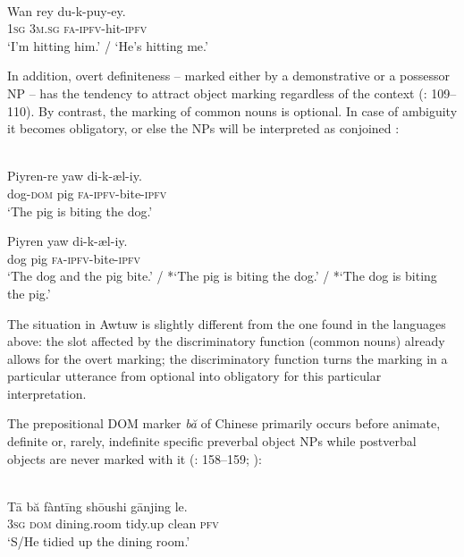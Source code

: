 \documentclass[output=paper]{langsci/langscibook}
\begin{document}
\ea\label{ex:serzant:18}
\\
\gll *Wan   rey   du-k-puy-ey.\\
     \textsc{1sg}   \textsc{3m.sg}  \textsc{fa-ipfv}{}-hit-\textsc{ipfv}\\
 ‘I’m hitting him.’ / ‘He’s hitting me.’
\z

In addition, overt definiteness – marked either by a demonstrative or a possessor NP – has the tendency to attract object marking regardless of the context (\citealt{Feldman1986}: 109\-–110). By contrast, the marking of common nouns is optional. In case of ambiguity it becomes obligatory, or else the NPs will be interpreted as conjoined \citep[110]{Feldman1986}:

\ea\label{ex:serzant:19}
\\
\ea
\gll Piyren-re  yaw  di-k-æl-iy.\\
     dog-\textsc{dom}  pig  \textsc{fa-ipfv}{}-bite-\textsc{ipfv}\\
\glt ‘The pig is biting the dog.’
\z

\ex
\gll Piyren  yaw  di-k-æl-iy.\\
     dog  pig  \textsc{fa-ipfv}{}-bite-\textsc{ipfv}\\
\glt ‘The dog and the pig bite.’ / *‘The pig is biting the dog.’ / *‘The dog is biting the pig.’
\z

The situation in Awtuw is slightly different from the one found in the languages above: the slot affected by the discriminatory function (common nouns) already allows for the overt marking; the discriminatory function turns the marking in a particular utterance from optional into obligatory for this particular interpretation.

The prepositional DOM marker \textit{bă} of Chinese primarily occurs before animate, definite or, rarely, indefinite specific preverbal object NPs while postverbal objects are never marked with it (\citealt{LiThompson1981,Bisang1992}: 158–159; \citealt{YangvanBergen2007}):

\ea \label{ex:serzant:20}
\\
\gll Tā   bă   fàntīng   shōushi   gānjing le.\\
     \textsc{3sg}  \textsc{dom}  dining.room   tidy.up   clean   \textsc{pfv}\\
\glt ‘S/He tidied up the dining room.’
\z
\end{document}
